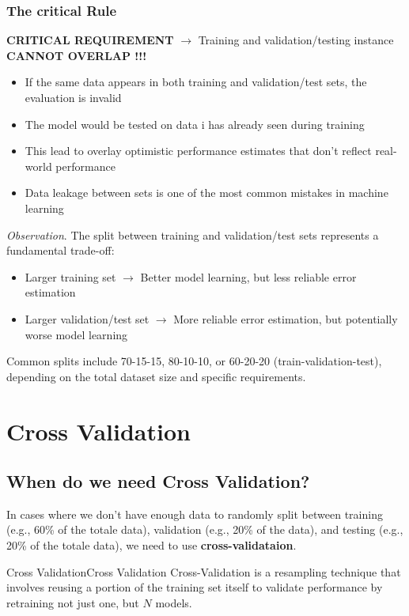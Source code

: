 \documentclass[a4paper]{article}
\theoremstyle{definition}
\begin{document}
\subsubsection{The critical Rule}
\textbf{CRITICAL REQUIREMENT} \( \rightarrow \) Training and validation/testing instance \textbf{CANNOT OVERLAP !!!}
\begin{itemize}
    \item If the same data appears in both training and validation/test sets, the evaluation is invalid 
    \item The model would be tested on data i has already seen during training 
    \item This lead to overlay optimistic performance estimates that don't reflect real-world performance 
    \item Data leakage between sets is one of the most common mistakes in machine learning
\end{itemize}
\textit{Observation}. The split between training and validation/test sets represents a fundamental trade-off:
\begin{itemize}
    \item Larger training set \( \rightarrow \) Better model learning, but less reliable error estimation 
    \item Larger validation/test set \( \rightarrow \) More reliable error estimation, but potentially worse model learning
\end{itemize}
Common splits include 70-15-15, 80-10-10, or 60-20-20 (train-validation-test), depending on the 
total dataset size and specific requirements.
\section{Cross Validation}
\subsection{When do we need Cross Validation?}
In cases where we don't have enough data to randomly split between training
(e.g., 60\% of the totale data), validation (e.g., 20\% of the data), and testing 
(e.g., 20\% of the totale data), we need to use \textbf{cross-validataion}.
\begin{definition}{Cross Validation}{Cross Validation}
Cross-Validation is a resampling technique that involves reusing 
a portion of the training set itself to validate performance by retraining not just one,
but \( N \) models.    
\end{definition}
\end{document}
